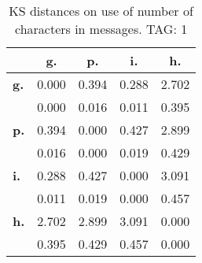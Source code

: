 \begin{table}[h!]
\begin{center}
\begin{tabular}{| l || c | c | c | c |}\hline
 & {\bf g.} & {\bf p.} & {\bf i.} & {\bf h.} \\\hline\hline
{\bf g.} & 0.000 & 0.394 & 0.288 & 2.702 \\
{\bf } & 0.000 & 0.016 & 0.011 & 0.395 \\\hline
{\bf p.} & 0.394 & 0.000 & 0.427 & 2.899 \\
{\bf } & 0.016 & 0.000 & 0.019 & 0.429 \\\hline
{\bf i.} & 0.288 & 0.427 & 0.000 & 3.091 \\
{\bf } & 0.011 & 0.019 & 0.000 & 0.457 \\\hline
{\bf h.} & 2.702 & 2.899 & 3.091 & 0.000 \\
{\bf } & 0.395 & 0.429 & 0.457 & 0.000 \\\hline
\end{tabular}
\caption{KS distances on use of number of characters in messages. TAG: 1}
\end{center}
\end{table}